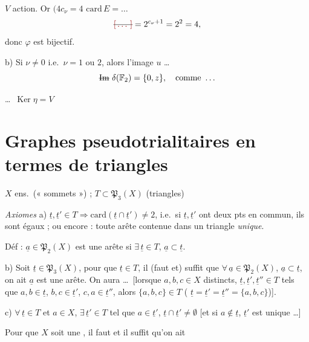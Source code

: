 \documentclass[11pt,a4paper]{article}
\begin{document}
$V$  action. Or $(4c_\nu = 4$ \struck{\ill{}} $\mathrm{card}\, E = \ldots$
\[
\text{\struck{\ill{}}} = 2^{c_\nu + 1} = 2^2 = 4,
\]
donc \struck{\ldots} $\varphi$ est bijectif.

b) Si $\nu \neq 0$ i.e.\ $\nu = 1$ ou $2$, alors l'image \struck{\ill{}} $u$ \ldots
\[
\text{\struck{Im}}\ \delta(\mathbb{F}_2) = \{0, z\}, \quad \text{comme} \ \ldots
\]
\struck{(\ldots)}

 \ldots\ $\operatorname{Ker} \eta = V$ \ 

\struck{\ill{}}

\section{Graphes pseudotrialitaires en termes de triangles}


$X$ ens.\ (« sommets ») ; \quad $T \subset \mathfrak{P}_3(X)$ (triangles)

\emph{Axiomes} \quad
a) $\underline{t}, \underline{t}' \in T \Rightarrow \mathrm{card}(\underline{t} \cap \underline{t}') \neq 2$,
i.e.\ si $\underline{t}, \underline{t}'$ ont deux pts en commun, ils sont égaux ; ou encore : toute arête contenue dans un triangle \emph{unique}.

Déf : $\underline{a} \in \mathfrak{P}_2(X)$ est une arête si $\exists\, \underline{t} \in T$, $\underline{a} \subset \underline{t}$.

b) Soit $\underline{t} \in \mathfrak{P}_3(X)$, pour que $\underline{t} \in T$, il (faut et) suffit que $\forall\, \underline{a} \in \mathfrak{P}_2(X)$, $\underline{a} \subset \underline{t}$, on ait $\underline{a}$ est une arête. On aura \ldots\ [lorsque $a,b,c \in X$ distincts, $\underline{t}, \underline{t}', \underline{t}'' \in T$ tels que $a,b \in \underline{t}$, $b,c \in \underline{t}'$, $c,a \in \underline{t}''$, alors $\{a,b,c\} \in T$ ( $\underline{t} = \underline{t}' = \underline{t}'' = \{a,b,c\}$)].

c) $\forall\, \underline{t} \in T$ et $a \in X$, $\exists\, \underline{t}' \in T$ tel que $a \in \underline{t}'$, $\underline{t} \cap \underline{t}' \neq \emptyset$ [et si $a \notin \underline{t}$, $\underline{t}'$ est unique \ldots]

Pour que $X$ soit une , il faut et il suffit qu'on ait
\end{document}
